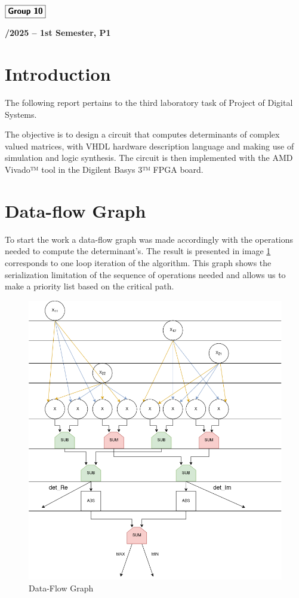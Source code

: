 \documentclass[12pt]{article}
\begin{document}
\begin{flushleft}
    \large $\boxed{\text{\bf \fontfamily{cmss}\selectfont Group 10}}$\\[4.0cm]
\end{flushleft}
    
\begin{center}
    \large \bf {}/2025 -- 1st Semester, P1
\end{center}

\thispagestyle{empty}

\setcounter{page}{0}

\newpage



\section{Introduction}
The following report pertains to the third laboratory task of Project of Digital Systems.

The objective is to design a circuit that computes determinants of complex valued matrices, with VHDL hardware description language and making use of simulation and logic synthesis. The circuit is then implemented with the AMD Vivado™ tool in the Digilent Basys 3™ FPGA board. 

\section{Data-flow Graph}
To start the work a data-flow graph was made accordingly with the operations needed to compute the determinant's. The result is presented in image \ref{fig:dataflow} corresponds to one loop iteration of the algorithm. This graph shows the serialization limitation of the sequence of operations needed and allows us to make a priority list based on the critical path.

\begin{figure}[H]
	\centering
	\includegraphics[width=0.55\linewidth]{images/DataFlowGraph.png}
	\caption{Data-Flow Graph}
	\label{fig:dataflow}
\end{figure}
\end{document}
